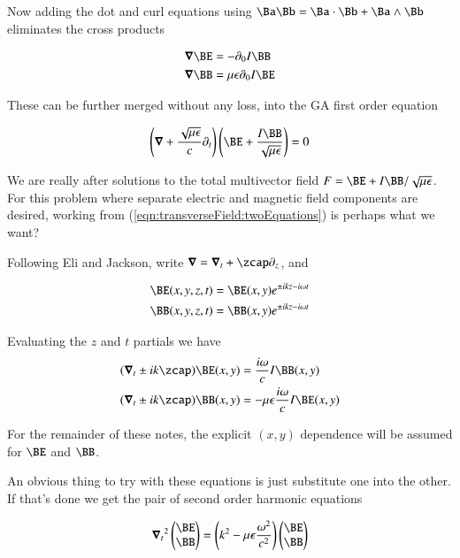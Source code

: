 Now adding the dot and curl equations using $\Ba \Bb = \Ba \cdot \Bb + \Ba \wedge \Bb$ eliminates the cross products

\begin{align}\label{eqn:transverseField:twoEquations}
\spacegrad \BE &= - \partial_0 I \BB \\
\spacegrad \BB &= \mu \epsilon \partial_0 I \BE
\end{align}

These can be further merged without any loss, into the GA first order equation

\begin{align}\label{eqn:transverseField:maxwell}
\left(\spacegrad + \frac{\sqrt{\mu\epsilon}}{c}\partial_t\right) \left(\BE + \frac{I\BB}{\sqrt{\mu\epsilon}} \right) = 0
\end{align}

We are really after solutions to the total multivector field $F = \BE + I \BB/\sqrt{\mu\epsilon}$.  For this problem where separate electric and magnetic field components are desired, working from (\ref{eqn:transverseField:twoEquations}) is perhaps what we want?

Following Eli and Jackson, write $\spacegrad = \spacegrad_t + \zcap \partial_z$, and 

\begin{align}\label{eqn:transverseField:blah3}
\BE(x,y,z,t) &= \BE(x,y) e^{\pm i k z - i \omega t} \\
\BB(x,y,z,t) &= \BB(x,y) e^{\pm i k z - i \omega t}
\end{align}

Evaluating the $z$ and $t$ partials we have
\begin{align}\label{eqn:transverseField:blah4}
(\spacegrad_t \pm i k \zcap) \BE(x,y) &= \frac{i\omega}{c} I \BB(x,y) \\
(\spacegrad_t \pm i k \zcap) \BB(x,y) &= -\mu \epsilon \frac{i\omega}{c} I \BE(x,y)
\end{align}

For the remainder of these notes, the explicit $(x,y)$ dependence will be assumed for $\BE$ and $\BB$.

An obvious thing to try with these equations is just substitute one into the other.  If that's done we get the pair of second order harmonic equations

\begin{align}\label{eqn:transverseField:blah5}
{\spacegrad_t}^2
\begin{pmatrix}\BE \\ \BB \end{pmatrix}
= \left( k^2 - \mu \epsilon \frac{\omega^2}{c^2} \right)
\begin{pmatrix}\BE \\ \BB \end{pmatrix}
\end{align}

